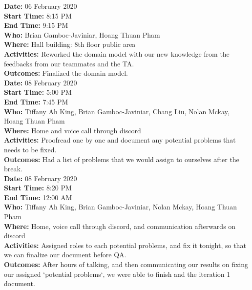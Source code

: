 \documentclass[12pt]{article}
\begin{document}
{\bf Date:} 06 February 2020\\
{\bf Start Time:} 8:15 PM\\
{\bf End Time:} 9:15 PM \\
{\bf Who:} Brian Gamboc-Javiniar, Hoang Thuan Pham\\
{\bf Where:} Hall building: 8th floor public area \\
{\bf Activities:} Reworked the domain model with our new knowledge from the feedbacks from our teammates and the TA.\\
{\bf Outcomes:} Finalized the domain model.\\

{\bf Date:} 08 February 2020\\
{\bf Start Time:} 5:00 PM\\
{\bf End Time:} 7:45 PM \\
{\bf Who:} Tiffany Ah King, Brian Gamboc-Javiniar, Chang Liu, Nolan Mckay, Hoang Thuan Pham\\
{\bf Where:} Home and voice call through discord \\
{\bf Activities:} Proofread one by one and document any potential problems that needs to be fixed.\\
{\bf Outcomes:} Had a list of problems that we would assign to ourselves after the break.\\

{\bf Date:} 08 February 2020\\
{\bf Start Time:} 8:20 PM\\
{\bf End Time:} 12:00 AM \\
{\bf Who:} Tiffany Ah King, Brian Gamboc-Javiniar, Nolan Mckay, Hoang Thuan Pham\\
{\bf Where:} Home, voice call through discord, and communication afterwards on discord \\
{\bf Activities:} Assigned roles to each potential problems, and fix it tonight, so that we can finalize our document before QA.\\
{\bf Outcomes:} After hours of talking, and then communicating our results on fixing our assigned `potential problems`, we were able to finish and the iteration 1 document.\\



\end{document}
